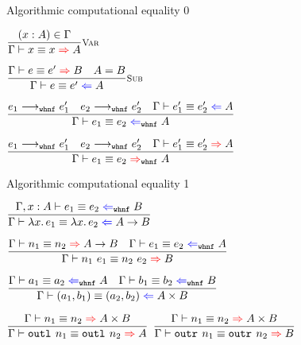 \documentclass{beamer}
\begin{document}
\begin{frame}{Algorithmic computational equality 0}

\begin{center}
  $\infrule[Var]{\sidecond{(x : A) \in \Gamma}}{\infercompeq{x}{x}{A}}$

  \vspace{2em}


  \vspace{2em}

  $\infrule[Sub]{\infercompeq{e}{e'}{B} \quad \sidecond{A = B}}{\checkcompeq{e}{e'}{A}}$

  \vspace{2em}

  $\infrule{\smallstepwhnf{e_1}{e_1'} \quad \smallstepwhnf{e_2}{e_2'} \quad \checkcompeq{e_1'}{e_2'}{A}}{\checkcompeqwhnf{e_1}{e_2}{A}}$

  \vspace{2em}

  $\infrule{\smallstepwhnf{e_1}{e_1'} \quad \smallstepwhnf{e_2}{e_2'} \quad \infercompeq{e_1'}{e_2'}{A}}{\infercompeqwhnf{e_1}{e_2}{A}}$
\end{center}

\end{frame}

\begin{frame}{Algorithmic computational equality 1}

\begin{center}
  $\infrule{\checkcompeqwhnf[\extend{\Gamma}{x}{A}]{e_1}{e_2}{B}}{\checkcompeq{\fun{x}{e_1}}{\fun{x}{e_2}}{\Fun{A}{B}}}$

  \vspace{2em}

  $\infrule{\infercompeq{n_1}{n_2}{\Fun{A}{B}} \quad \checkcompeqwhnf{e_1}{e_2}{A}}{\infercompeq{\app{n_1}{e_1}}{\app{n_2}{e_2}}{B}}$

  \vspace{2em}

  $\infrule{\checkcompeqwhnf{a_1}{a_2}{A} \quad \checkcompeqwhnf{b_1}{b_2}{B}}{\checkcompeq{\pair{a_1}{b_1}}{\pair{a_2}{b_2}}{\Prod{A}{B}}}$

  \vspace{2em}

  $\infrule{\infercompeq{n_1}{n_2}{\Prod{A}{B}}}{\infercompeq{\outl{n_1}}{\outl{n_2}}{A}}$ \quad
  $\infrule{\infercompeq{n_1}{n_2}{\Prod{A}{B}}}{\infercompeq{\outr{n_1}}{\outr{n_2}}{B}}$
\end{center}

\end{frame}
\end{document}
